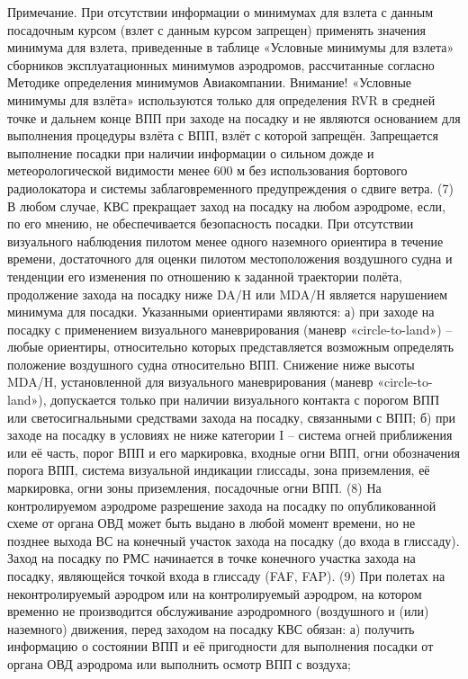 Примечание. При отсутствии информации о минимумах для взлета с данным посадочным курсом (взлет с данным курсом запрещен) применять значения минимума для взлета, приведенные в таблице «Условные минимумы для взлета» сборников эксплуатационных минимумов аэродромов, рассчитанные согласно Методике определения минимумов Авиакомпании.
Внимание!
«Условные минимумы для взлёта» используются только для определения RVR в средней точке и дальнем конце ВПП при заходе на посадку и не являются основанием для выполнения процедуры взлёта с ВПП, взлёт с которой запрещён.
Запрещается выполнение посадки при наличии информации о сильном дожде и метеорологической видимости менее 600 м без использования бортового радиолокатора и системы заблаговременного предупреждения о сдвиге ветра. 
(7) В любом случае, КВС прекращает заход на посадку на любом аэродроме, если, по его мнению, не обеспечивается безопасность посадки. 
При отсутствии визуального наблюдения пилотом менее одного наземного ориентира в течение времени, достаточного для оценки пилотом местоположения воздушного судна и тенденции его изменения по отношению к заданной траектории полёта, продолжение захода на посадку ниже DA/H или MDA/H является нарушением минимума для посадки.
Указанными ориентирами являются:
а)	при заходе на посадку с применением визуального маневрирования (маневр «circle-to-land») – любые ориентиры, относительно которых представляется возможным определять положение воздушного судна относительно ВПП. Снижение ниже высоты MDA/H, установленной для визуального маневрирования (маневр «circle-to-land»), допускается только при наличии визуального контакта с порогом ВПП или светосигнальными средствами захода на посадку, связанными с ВПП;
б)	при заходе на посадку в условиях не ниже категории I – система огней приближения или её часть, порог ВПП и его маркировка, входные огни ВПП, огни обозначения порога ВПП, система визуальной индикации глиссады, зона приземления, её маркировка, огни зоны приземления, посадочные огни ВПП.
(8) На контролируемом аэродроме разрешение захода на посадку по опубликованной схеме от органа ОВД может быть выдано в любой момент времени, но не позднее выхода ВС на конечный участок захода на посадку (до входа в глиссаду). Заход на посадку по РМС начинается в точке конечного участка захода на посадку, являющейся точкой входа в глиссаду (FAF, FAP).
(9) При полетах на неконтролируемый аэродром или на контролируемый аэродром, на котором временно не производится обслуживание аэродромного (воздушного и (или) наземного) движения, перед заходом на посадку КВС обязан: 
а)	получить информацию о состоянии ВПП и её пригодности для выполнения посадки от органа ОВД аэродрома или выполнить осмотр ВПП с воздуха;
